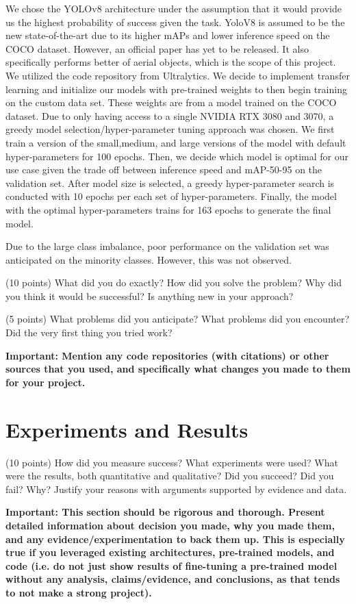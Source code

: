 \documentclass[10pt,twocolumn,letterpaper]{article}
\begin{document}
We chose the YOLOv8 architecture under the assumption that it would provide us the highest probability of success given the task. YoloV8 is 
assumed to be the new state-of-the-art due to its higher mAPs and lower inference speed on the COCO dataset. However, an official paper has 
yet to be released. It also specifically performs better of aerial objects, which is the scope of this project. We utilized the code repository 
from Ultralytics. We decide to implement transfer learning and initialize our models with pre-trained weights to then begin training on the 
custom data set. These weights are from a model trained on the COCO dataset. Due to only having access to a single NVIDIA RTX 3080 and 3070, 
a greedy model selection/hyper-parameter tuning approach was chosen. We first train a version of the small,medium, and large versions of the 
model with default hyper-parameters for 100 epochs. Then, we decide which model is optimal for our use case given the trade off between inference 
speed and mAP-50-95 on the validation set. After model size is selected, a greedy hyper-parameter search is conducted with 10 epochs per each 
set of hyper-parameters. Finally, the model with the optimal hyper-parameters trains for 163 epochs to generate the final model.

Due to the large class imbalance, poor performance on the validation set was anticipated on the minority classes. However, this was not observed.

(10 points) What did you do exactly? How did you solve the problem? Why did you think it would be successful? Is anything new in your approach? 

(5 points) What problems did you anticipate? What problems did you encounter? Did the very first thing you tried work? 

\textbf{Important: Mention any code repositories (with citations) or other sources that you used, and specifically what changes you made to them for your project. }

\section{Experiments and Results}

(10 points) How did you measure success? What experiments were used? What were the results, both quantitative and qualitative? Did you succeed? Did you fail? Why? Justify your reasons with arguments supported by evidence and data.

\textbf{Important: This section should be rigorous and thorough. Present detailed information about decision you made, why you made them, and any evidence/experimentation to back them up. This is especially true if you leveraged existing architectures, pre-trained models, and code (i.e. do not just show results of fine-tuning a pre-trained model without any analysis, claims/evidence, and conclusions, as that tends to not make a strong project). }
\end{document}

